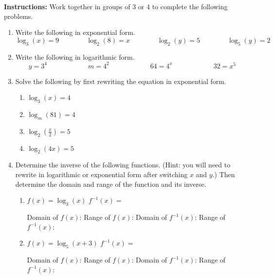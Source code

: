 



\noindent \textbf{Instructions:}  Work together in groups of  3 or 4 to complete the following problems.




\begin{enumerate}
\item Write the following in exponential form.
 $$\log_3(x)=9   \quad \quad \quad \quad \log_2(8)=x   \quad \quad \quad \quad \log_2(y)=5  \quad \quad  \quad \quad \log_5(y)=2$$
\vfill
\item Write the following in logarithmic form.
 $$y=3^4  \quad \quad \quad \quad \quad \quad m=4^2  \quad \quad \quad \quad \quad \quad 64=4^x \quad \quad \quad \quad  \quad \quad 32=x^5$$
\vfill
\item Solve the following by first rewriting the equation in exponential form.
\begin{enumerate}
\item $\log_3(x)=4$
\vfill
\vfill
\item $\log_{m}(81)=4$
\vfill
\vfill
\item $\displaystyle \log_2(\frac{x}{2})=5$
\vfill
\vfill
\item $\log_2(4x)=5$
\vfill
\vfill
\end{enumerate}



\newpage
\item Determine the inverse of the following functions.  (Hint:  you will need to rewrite in logarithmic or exponential form after switching $x$ and $y$.)  Then determine the domain and range of the function and its inverse.
\begin{enumerate}
\item $f(x)=\log_3(x)$ \quad \quad \quad $f^{-1}(x)=$
\begin{flushright}
 Domain of $f(x)$:  \quad \quad \quad\quad\quad\quad Range of $f(x)$:\quad\quad\quad\quad \vfill
Domain of $f^{-1}(x)$:   \quad \quad\quad\quad\quad Range of $f^{-1}(x)$:\quad\quad\quad\quad
\end{flushright}
\vfill
\item $f(x)=\log_5(x+3)$  \quad \quad \quad $f^{-1}(x)=$
\begin{flushright}
Domain of $f(x)$:  \quad \quad \quad\quad\quad\quad Range of $f(x)$:\quad\quad\quad\quad \vfill
Domain of $f^{-1}(x)$:   \quad \quad\quad\quad\quad Range of $f^{-1}(x)$:\quad\quad\quad\quad
\end{flushright}


\end{enumerate}
\end{enumerate}
